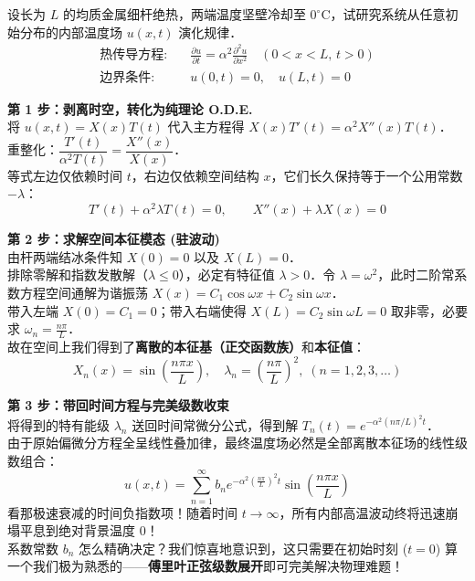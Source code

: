 \documentclass[12pt, a4paper, oneside, UTF8]{ctexbook}
\begin{document}
\begin{example}[一维热传导方程初值问题]
    设长为 $L$ 的均质金属细杆绝热，两端温度坚壁冷却至 $0^\circ \text{C}$，试研究系统从任意初始分布的内部温度场 $u(x,t)$ 演化规律．
    \begin{align*}
        \textbf{热传导方程:} \quad & \frac{\partial u}{\partial t} = \alpha^2 \frac{\partial^2 u}{\partial x^2} \quad (0<x<L, \, t>0) \\
        \textbf{边界条件:} \quad & u(0,t) = 0, \quad u(L,t) = 0
    \end{align*}
\end{example}
\begin{solution}
    \textbf{第 1 步：剥离时空，转化为纯理论 O.D.E.}\\
    将 $u(x,t) = X(x)T(t)$ 代入主方程得 $X(x)T'(t) = \alpha^2 X''(x)T(t)$．\\
    重整化：$\dfrac{T'(t)}{\alpha^2 T(t)} = \dfrac{X''(x)}{X(x)}$．\\
    等式左边仅依赖时间 $t$，右边仅依赖空间结构 $x$，它们长久保持等于一个公用常数 $-\lambda$：
    \[ T'(t) + \alpha^2 \lambda T(t) = 0, \qquad X''(x) + \lambda X(x) = 0 \]
    
    \textbf{第 2 步：求解空间本征模态 (驻波动)}\\
    由杆两端结冰条件知 $X(0)=0$ 以及 $X(L)=0$．\\
    排除零解和指数发散解（$\lambda \le 0$），必定有特征值 $\lambda > 0$．令 $\lambda = \omega^2$，此时二阶常系数方程空间通解为谐振荡 $X(x) = C_1 \cos\omega x + C_2 \sin\omega x$．\\
    带入左端 $X(0) = C_1 = 0$；带入右端使得 $X(L) = C_2 \sin\omega L = 0$ 取非零，必要求 $\omega_n = \frac{n\pi}{L}$．\\
    故在空间上我们得到了\textbf{离散的本征基（正交函数族）}和\textbf{本征值}：
    \[ X_n(x) = \sin\left(\frac{n\pi x}{L}\right), \quad \lambda_n = \left(\frac{n\pi}{L}\right)^2, \; (n=1,2,3,\dots) \]
    
    \textbf{第 3 步：带回时间方程与完美级数收束}\\
    将得到的特有能级 $\lambda_n$ 送回时间常微分公式，得到解 $T_n(t) = e^{-\alpha^2 (n\pi/L)^2 t}$．\\
    由于原始偏微分方程全呈线性叠加律，最终温度场必然是全部离散本征场的线性级数组合：
    \[ u(x,t) = \sum_{n=1}^\infty b_n e^{-\alpha^2 \left(\frac{n\pi}{L}\right)^2 t} \sin\left(\frac{n\pi x}{L}\right) \]
    看那极速衰减的时间负指数项！随着时间 $t \to \infty$，所有内部高温波动终将迅速崩塌平息到绝对背景温度 $0$！\\
    系数常数 $b_n$ 怎么精确决定？我们惊喜地意识到，这只需要在初始时刻 ($t=0$) 算一个我们极为熟悉的——\textbf{傅里叶正弦级数展开}即可完美解决物理难题！
\end{solution}

\ifx\allfiles\undefined
\end{document}
